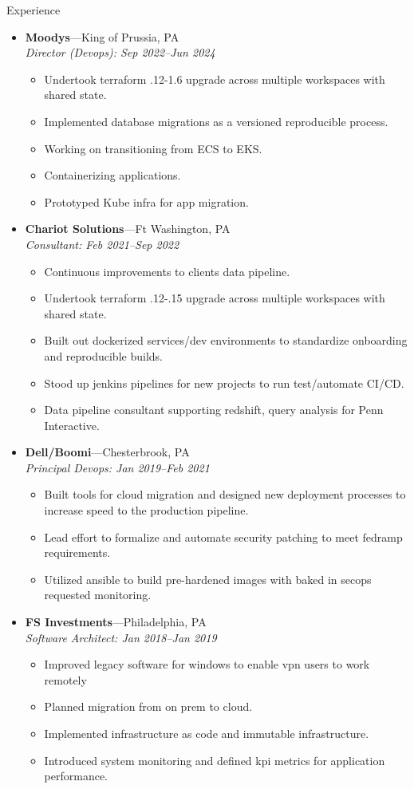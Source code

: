 \documentclass[11pt,oneside]{article}
\newenvironment{ressection}[1]{
        \vspace{4pt}
        {\fontfamily{phv}\selectfont\Large#1}
        \begin{itemize}
        \vspace{3pt}
}{
        \end{itemize}
}
\newcommand{\ressubitem}[1]{
        \vspace{-1pt}
        \item \begin{flushleft} #1 \end{flushleft}
}
\newcommand{\resbigitem}[3]{
        \vspace{-5pt}
        \item
        \textbf{#1}---#2 \\
        \textit{#3}
}
\newenvironment{ressubsec}[3]{
        \resbigitem{#1}{#2}{#3}
        \vspace{-2pt}
        \begin{itemize}
}{
        \end{itemize}
}
\begin{document}
\begin{ressection}{Experience}
          \begin{ressubsec}{Moodys}{King of Prussia, PA}{Director (Devops): Sep 2022--Jun 2024}
          \ressubitem{Undertook terraform .12-1.6 upgrade across multiple workspaces with shared state.}
          \ressubitem{Implemented database migrations as a versioned reproducible process.}            
          \ressubitem{Working on transitioning from ECS to EKS.}
          \ressubitem{Containerizing applications.}
          \ressubitem{Prototyped Kube infra for app migration.}
        \end{ressubsec}

        \begin{ressubsec}{Chariot Solutions}{Ft Washington, PA}{Consultant: Feb 2021--Sep 2022}
          \ressubitem{Continuous improvements to clients data pipeline. }
          \ressubitem{Undertook terraform .12-.15 upgrade across multiple workspaces with shared state.}
          \ressubitem{Built out dockerized services/dev environments to standardize onboarding and reproducible builds.}
          \ressubitem{Stood up jenkins pipelines for new projects to run test/automate CI/CD.}
          \ressubitem{Data pipeline consultant supporting redshift, query analysis for Penn Interactive.}          
        \end{ressubsec}

  
        \begin{ressubsec}{Dell/Boomi}{Chesterbrook, PA}{Principal Devops: Jan 2019--Feb 2021}
          \ressubitem{Built tools for cloud migration and designed new deployment processes to increase speed to the production pipeline. }
          \ressubitem{Lead effort to formalize and automate security patching to meet fedramp requirements.}
          \ressubitem{Utilized ansible to build pre-hardened images with baked in secops requested monitoring.}
        \end{ressubsec}
  
        \begin{ressubsec}{FS Investments}{Philadelphia, PA}{Software Architect: Jan 2018--Jan 2019}
          \ressubitem{Improved legacy software for windows to enable vpn users to work remotely }
          \ressubitem{Planned migration from on prem to cloud.}
          \ressubitem{Implemented infrastructure as code and immutable infrastructure. }
          \ressubitem{Introduced system monitoring and defined kpi metrics for application performance. }          
        \end{ressubsec}
  

\end{ressection}
\end{document}
